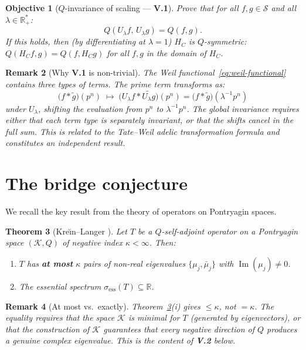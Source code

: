 \documentclass[11pt]{amsart}
\newtheorem{theorem}{Theorem}[section]
\newtheorem{remark}[theorem]{Remark}
\newtheorem{objective}[theorem]{Objective}
\renewcommand{\Im}{\operatorname{Im}}
\newcommand{\kap}{\kappa}
\newcommand{\Kcal}{\mathcal{K}}
\newcommand{\Scal}{\mathcal{S}}
\begin{document}
\begin{objective}[$Q$-invariance of scaling — \textbf{V.1}]\label{obj:V1}
Prove that for all $f, g \in \Scal$ and all $\lambda \in \mathbb{R}^*_+$:
\[
  Q(U_\lambda f,\, U_\lambda g) = Q(f, g).
\]
If this holds, then (by differentiating at $\lambda=1$) $H_C$ is $Q$-symmetric:
$Q(H_C f, g) = Q(f, H_C g)$ for all $f, g$ in the domain of $H_C$.
\end{objective}

\begin{remark}[Why \textbf{V.1} is non-trivial]\label{rem:V1-nontrivial}
The Weil functional~\eqref{eq:weil-functional} contains three types of terms.
The prime term transforms as:
\[
  \bigl(f * \tilde g\bigr)(p^n)
  \;\longmapsto\;
  \bigl(U_\lambda f * \widetilde{U_\lambda g}\bigr)(p^n)
  = \bigl(f * \tilde g\bigr)(\lambda^{-1}p^n)
\]
under $U_\lambda$, shifting the evaluation from $p^n$ to $\lambda^{-1}p^n$.  The global
invariance requires either that each term type is separately invariant, or that the
shifts cancel in the full sum.  This is related to the Tate--Weil adelic transformation
formula and constitutes an independent result.
\end{remark}

\section{The bridge conjecture}
\label{sec:bridge}

We recall the key result from the theory of operators on Pontryagin spaces.

\begin{theorem}[Kre\u{\i}n--Langer \cite{KreinLanger78, AzizovIokhvidov}]
\label{thm:KL}
Let $T$ be a $Q$-self-adjoint operator on a Pontryagin space $(\Kcal, Q)$ of negative
index $\kap < \infty$.  Then:
\begin{enumerate}
\item[\emph{(i)}] $T$ has \textbf{at most} $\kap$ pairs of non-real eigenvalues
  $\{\mu_j, \bar\mu_j\}$ with $\Im(\mu_j) \ne 0$.
\item[\emph{(ii)}] The essential spectrum $\sigma_\mathrm{ess}(T) \subseteq \mathbb{R}$.
\end{enumerate}
\end{theorem}

\begin{remark}[At most vs.\ exactly]\label{rem:atmost}
Theorem~\ref{thm:KL}(i) gives $\le \kap$, not $= \kap$.  The equality requires that
the space $\Kcal$ is \emph{minimal} for $T$ (generated by eigenvectors), or that the
construction of $\Kcal$ guarantees that every negative direction of $Q$ produces a
genuine complex eigenvalue.  This is the content of \textbf{V.2} below.
\end{remark}
\end{document}

